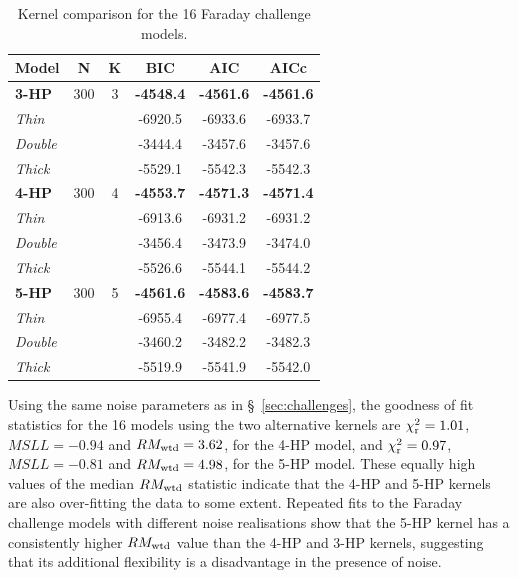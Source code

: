 \documentclass[fleqn,usenatbib]{mnras}
\begin{document}
\begin{table}
\caption{Kernel comparison for the 16 Faraday challenge models.\label{tab:infocriteria}}
    \centering
    \begin{tabular}{l|cc|ccc}
    \hline
    Model & N & K & BIC & AIC & AICc \\\hline
    \textbf{3-HP}               & 300 & 3 & \textbf{-4548.4} & \textbf{-4561.6} & \textbf{-4561.6} \\
    {\it Thin}               & &   & -6920.5 & -6933.6 & -6933.7\\
    {\it Double}               & &   & -3444.4 & -3457.6 & -3457.6\\
    {\it Thick}               & &   & -5529.1 & -5542.3 & -5542.3 \\
    \textbf{4-HP}               & 300 & 4 & \textbf{-4553.7} & \textbf{-4571.3} & \textbf{-4571.4}\\
    {\it Thin}             & &   & -6913.6 & -6931.2& -6931.2\\
    {\it Double}             & &   & -3456.4 & -3473.9 & -3474.0\\
    {\it Thick}            & &   & -5526.6 & -5544.1 & -5544.2 \\
    \textbf{5-HP}               & 300 & 5 & \textbf{-4561.6} & \textbf{-4583.6} & \textbf{-4583.7}\\
    {\it Thin}            & &   & -6955.4 & -6977.4 & -6977.5\\
    {\it Double}              & &   & -3460.2 & -3482.2 & -3482.3\\
    {\it Thick}            & &   & -5519.9 & -5541.9 & -5542.0\\\hline
    \end{tabular}
\end{table}
%
%
%
Using the same noise parameters as in \S~\ref{sec:challenges}, the goodness of fit statistics for the 16 models using the two alternative kernels are $\chi^2_{\rm r} = 1.01$, $MSLL=-0.94$ and $RM_{\rm wtd}=3.62$, for the 4-HP model, and $\chi^2_{\rm r} = 0.97$, $MSLL=-0.81$ and $RM_{\rm wtd}=4.98$, for the 5-HP model. 
These equally high values of the median $RM_{\rm wtd}$ statistic indicate that the 4-HP and 5-HP kernels are also over-fitting the data to some extent. Repeated fits to the Faraday challenge models with different noise realisations show that the 5-HP kernel has a consistently higher $RM_{\rm wtd}$ value than the 4-HP and 3-HP kernels, suggesting that its additional flexibility is a disadvantage in the presence of noise.
\end{document}
